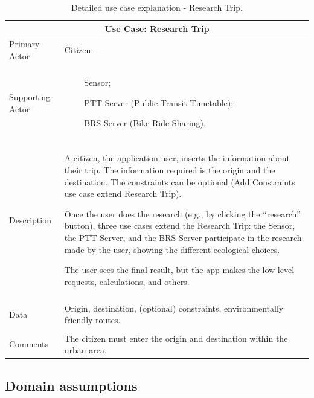 \documentclass[a4paper]{article}
\newcommand{\dquotes}[1]{``#1''}
\begin{document}
    \begin{table}[!htp]
        \centering
        \begin{tabular}{@{} l p{23em} @{}}
            \toprule
            \multicolumn{2}{c}{Use Case: \textbf{Research Trip}} \\ 
            \midrule
            Primary Actor 
            & 
            Citizen. \\ \\
            Supporting Actor 
            & 
            ~~\llap{\textbullet}~~ Sensor;

            ~~\llap{\textbullet}~~ PTT Server (Public Transit Timetable);

            ~~\llap{\textbullet}~~ BRS Server (Bike-Ride-Sharing). \\ \\
            Description 
            &
            A citizen, the application user, inserts the information about their trip. The information required is the origin and the destination. The constraints can be optional (Add Constraints use case extend Research Trip). 
            
            Once the user does the research (e.g., by clicking the \dquotes{research} button), three use cases extend the Research Trip: the Sensor, the PTT Server, and the BRS Server participate in the research made by the user, showing the different ecological choices. 
            
            The user sees the final result, but the app makes the low-level requests, calculations, and others. \\ \\
            Data 
            &
            Origin, destination, (optional) constraints, environmentally friendly routes. \\ \\
            Comments 
            &
            The citizen must enter the origin and destination within the urban area. \\
            \bottomrule
        \end{tabular}
        \caption{Detailed use case explanation - Research Trip.}
        \label{Use Case - Research Trip}
    \end{table}

    \newpage

    \subsection{Domain assumptions}
\end{document}

